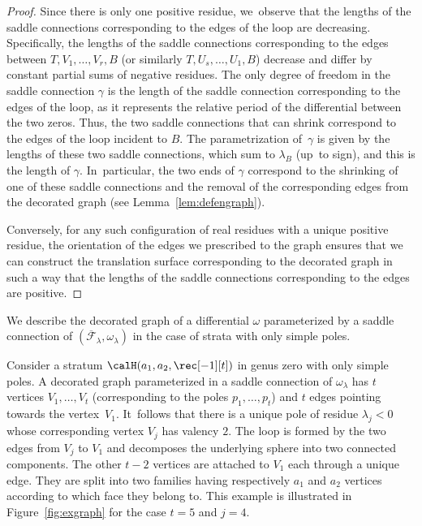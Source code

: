 \begin{proof}
Since there is only one positive residue, we~observe that the lengths of the saddle connections corresponding to the edges of the loop are decreasing. Specifically, the lengths of the saddle connections corresponding to the edges between $T,V_{1},\dots,V_{r},B$ (or similarly $T,U_{s},\dots,U_{1},B$) decrease and differ by constant partial sums of negative residues. The only degree of freedom in the saddle connection $\gamma$ is the length of the saddle connection corresponding to the edges of the loop, as it represents the relative period of the differential between the two zeros. Thus, the two saddle connections that can shrink correspond to the edges of the loop incident to $B$. The parametrization of~$\gamma$ is given by the lengths of these two saddle connections, which sum to $\lambda_{B}$ (up~to sign), and this is the length of $\gamma$. In~particular, the two ends of $\gamma$ correspond to the shrinking of one of these saddle connections and the removal of the corresponding edges from the decorated graph (see Lemma~\ref{lem:defengraph}).

Conversely, for any such configuration of real residues with a unique positive residue, the orientation of the edges we prescribed to the graph ensures that we can construct the translation surface corresponding to the decorated graph in such a way that the lengths of the saddle connections corresponding to the edges are positive.
\end{proof}

We describe the decorated graph of a differential $\omega$ parameterized by a saddle connection of $(\overline{\mathcal{F}}_{\lambda}, \omega_\lambda)$ in the case of strata with only simple poles.
\begin{ex}
Consider a stratum $\calH(a_{1},a_{2},\rec[-1][t])$ in genus zero with only simple poles. A decorated graph parameterized in a saddle connection of $\omega_\lambda$
has $t$ vertices $V_{1},\dots,V_{t}$ (corresponding to the poles $p_{1},\dots,p_{t}$) and $t$ edges pointing towards the vertex~$V_{1}$. It~follows that there is a unique pole of residue $\lambda_{j}<0$ whose corresponding vertex $V_{j}$ has valency $2$. The loop is formed by the two edges from $V_{j}$ to $V_{1}$ and decomposes the underlying sphere into two connected components. The other $t-2$ vertices are attached to $V_{1}$ each through a unique edge. They are split into two families having respectively $a_{1}$ and $a_{2}$ vertices according to which face they belong to. This example is illustrated in Figure~\ref{fig:exgraph} for the case $t = 5$ and $j=4$.
\end{ex}


